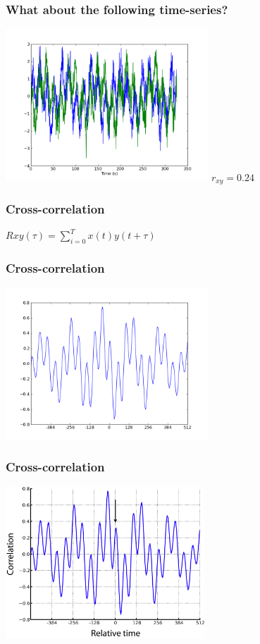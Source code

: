 \documentclass{beamer}
\begin{document}
\begin{frame}
\frametitle{What about the following time-series?}
\includegraphics[height=5.7cm]{figures/outa_phase_tseries}
\pause
$r_{xy}=0.24$
\end{frame}

\begin{frame}
\frametitle{Cross-correlation}
$Rxy(\tau) = \sum_{i=0}^{T}{x(t)y(t+\tau)}$
\end{frame}

\begin{frame}
\frametitle{Cross-correlation}
\includegraphics[height=5.7cm]{figures/outa_phase_xcorr}
\end{frame}

\begin{frame}
\frametitle{Cross-correlation}
\includegraphics[height=5.7cm]{figures/outa_phase_xcorr_w_arrow}
\end{frame}
\end{document}
